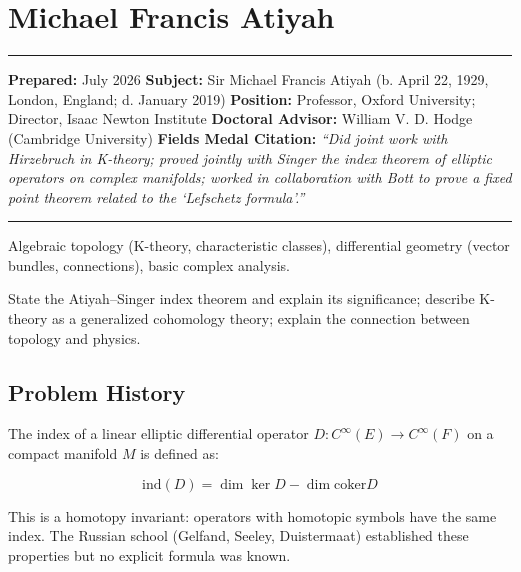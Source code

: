 \chapter{Michael Francis Atiyah}\label{ch1966michael-francis-atiyah:michael-francis-atiyah-fields-medal-1966-a-comprehensive-report}

\begin{center}\rule{0.5\linewidth}{0.5pt}\end{center}

\textbf{Prepared:} July 2026
\textbf{Subject:} Sir Michael Francis Atiyah (b. April 22, 1929, London, England; d. January 2019)
\textbf{Position:} Professor, Oxford University; Director, Isaac Newton Institute
\textbf{Doctoral Advisor:} William V. D. Hodge (Cambridge University)
\textbf{Fields Medal Citation:} \emph{``Did joint work with Hirzebruch in K-theory;
proved jointly with Singer the index theorem of elliptic operators on complex
manifolds; worked in collaboration with Bott to prove a fixed point theorem
related to the `Lefschetz formula'.''}

\begin{center}\rule{0.5\linewidth}{0.5pt}\end{center}

\begin{prereqs}
Algebraic topology (K-theory, characteristic classes), differential
geometry (vector bundles, connections), basic complex analysis.
\end{prereqs}

\begin{objectives}
State the Atiyah--Singer index theorem \cite{atiyah1963} and explain its significance;
describe K-theory as a generalized cohomology theory; explain the
connection between topology and physics.
\end{objectives}

\section{Problem History}

The index of a linear elliptic differential operator $D: C^\infty(E) \to
C^\infty(F)$ on a compact manifold $M$ is defined as:

\[\text{ind}(D) = \dim \ker D - \dim \text{coker} D\]

This is a homotopy invariant: operators with homotopic symbols have the same
index. The Russian school (Gelfand, Seeley, Duistermaat) established these
properties but no explicit formula was known.

